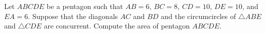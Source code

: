 Let $ABCDE$ be a pentagon such that $AB=6$, $BC=8$, $CD=10$, $DE=10$, and $EA=6$. Suppose that the diagonals $AC$ and $BD$ and the circumcircles of $\triangle{ABE}$ and $\triangle{CDE}$ are concurrent. Compute the area of pentagon $ABCDE$.
